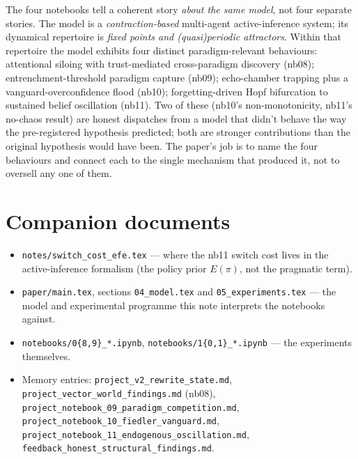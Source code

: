 \documentclass[11pt,a4paper]{article}
\theoremstyle{plain}
\begin{document}
The four notebooks tell a coherent story \emph{about the same model},
not four separate stories. The model is a \emph{contraction-based}
multi-agent active-inference system; its dynamical repertoire is
\emph{fixed points and (quasi)periodic attractors}. Within that
repertoire the model exhibits four distinct paradigm-relevant
behaviours: attentional siloing with trust-mediated cross-paradigm
discovery (nb08); entrenchment-threshold paradigm capture (nb09);
echo-chamber trapping plus a vanguard-overconfidence flood (nb10);
forgetting-driven Hopf bifurcation to sustained belief oscillation
(nb11). Two of these (nb10's non-monotonicity, nb11's no-chaos
result) are honest dispatches from a model that didn't behave the way
the pre-registered hypothesis predicted; both are stronger
contributions than the original hypothesis would have been. The
paper's job is to name the four behaviours and connect each to the
single mechanism that produced it, not to oversell any one of them.

\section*{Companion documents}

\begin{itemize}\itemsep1pt
\item \texttt{notes/switch\_cost\_efe.tex} --- where the nb11 switch
cost lives in the active-inference formalism (the policy prior
$E(\pi)$, not the pragmatic term).
\item \texttt{paper/main.tex}, sections \texttt{04\_model.tex} and
\texttt{05\_experiments.tex} --- the model and experimental programme
this note interprets the notebooks against.
\item \texttt{notebooks/0\{8,9\}\_*.ipynb},
\texttt{notebooks/1\{0,1\}\_*.ipynb} --- the experiments themselves.
\item Memory entries: \texttt{project\_v2\_rewrite\_state.md},
\texttt{project\_vector\_world\_findings.md} (nb08),
\texttt{project\_notebook\_09\_paradigm\_competition.md},
\texttt{project\_notebook\_10\_fiedler\_vanguard.md},
\texttt{project\_notebook\_11\_endogenous\_oscillation.md},
\texttt{feedback\_honest\_structural\_findings.md}.
\end{itemize}
\end{document}

